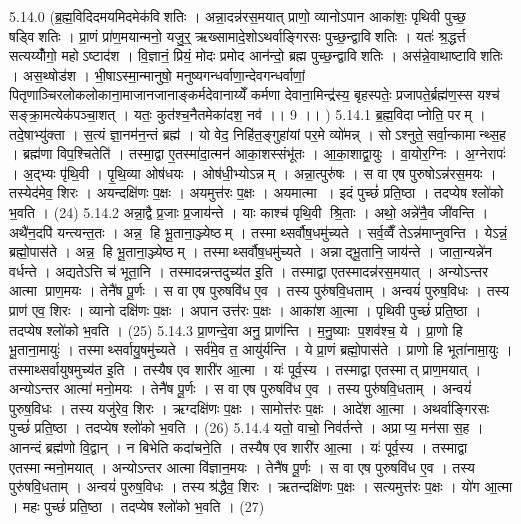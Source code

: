 5.14.0
(ब्र॒ह्म॒विदिदमयमिदमेक॑विशतिः । अन्ना॒दन्न॑रस॒मयात् प्राणो॒ व्यानोऽपान आका॑शः॒ पृथिवी पुच्छ॒ षड्विशतिः । प्रा॒णं प्रा॑ण॒मयान्मनो॒ यजु॒र्॒ ऋख्सामादे॒शोऽथर्वाङ्गिरसः पुच्छ॒न्द्वाविशतिः । यतः॑ श्र॒द्धर्त्त सत्यय्योँ॑गो॒ महोऽष्टाद॑श । वि॒ज्ञानं॒ प्रियं॒ मोदः प्रमोद आन॑न्दो॒ ब्रह्म पुच्छ॒न्द्वाविशतिः । अस॑न्ने॒वाथाष्टाविशतिः । अस॒थ्षोड॑श । भी॒षाऽस्मा॒न्मानुषो॒ मनुष्यगन्धर्वाणा॒न्देवगन्धर्वाणां॒ पितृणाञ्चिरलोकलोकाना॒माजानजानाङ्कर्मदेवानाय्येँ कर्मणा देवाना॒मिन्द्र॑स्य॒ बृहस्पतेः॒ प्रजापते॒र्ब्रह्म॑ण॒स्स यश्च॑ सङ्क्रा॒मत्येक॑पञ्चा॒शत् । यतः॒ कुत॑श्च॒नैतमेका॑दश॒ नव॑ ।। 9 ।। )
5.14.1
ब्र॒ह्म॒विदाप्नोति॒ परम् । तदे॒षाभ्यु॑क्ता । स॒त्यं ज्ञा॒नम॑न॒न्तं ब्रह्म॑ । यो वेद॒ निहि॑त॒ङ्गुहा॑यां पर॒मे व्यो॑मन्न् । सोऽश्नुते॒ सर्वा॒न्कामान्थ्स॒ह । ब्रह्म॑णा विप॒श्चितेति॑ । तस्मा॒द्वा ए॒तस्मा॑दा॒त्मन॑ आका॒शस्संभू॑तः । आ॒का॒शाद्वा॒युः । वा॒योर॒ग्निः । अ॒ग्नेरापः॑ । अ॒द्भ्यः पृ॑थि॒वी । पृ॒थि॒व्या ओष॑धयः । ओष॑धी॒भ्योऽन्नम् । अन्ना॒त्पुरु॑षः । स वा एष पुरुषोऽन्न॑रस॒मयः । तस्येद॑मेव॒ शिरः । अयन्दक्षि॑णः प॒क्षः । अयमुत्त॑रः प॒क्षः । अयमात्मा । इदं पुच्छं॑ प्रति॒ष्ठा । तदप्येष श्लो॑को भ॒वति । (24)
5.14.2
अन्ना॒द्वै प्र॒जाः प्र॒जाय॑न्ते । याः काश्च॑ पृथि॒वी श्रि॒ताः । अथो॒ अन्ने॑नै॒व जी॑वन्ति । अथै॑न॒दपि॑ यन्त्यन्त॒तः । अन्न॒ हि भू॒ताना॒ञ्ज्येष्ठम् । तस्माथ्सर्वौष॒धमु॑च्यते । सर्व॒व्वैँ तेऽन्न॑माप्नुवन्ति । येऽन्नं॒ ब्रह्मो॒पास॑ते । अन्न॒ हि भू॒ताना॒ञ्ज्येष्ठम् । तस्माथ्सर्वौष॒धमु॑च्यते । अन्नाद्भू॒तानि॒ जाय॑न्ते । जाता॒न्यन्ने॑न वर्धन्ते । अद्यतेऽत्ति च॑ भूता॒नि । तस्मादन्नन्तदुच्य॑त इ॒ति । तस्माद्वा एतस्मादन्न॑रस॒मयात् । अन्योऽन्तर आत्मा प्राण॒मयः । तेनै॑ष पू॒र्णः । स वा एष पुरुषवि॑ध ए॒व । तस्य पुरु॑षवि॒धताम् । अन्वयं॑ पुरुष॒विधः । तस्य प्राण॑ एव॒ शिरः । व्यानो दक्षि॑णः प॒क्षः । अपान उत्त॑रः प॒क्षः । आका॑श आ॒त्मा । पृथिवी पुच्छं॑ प्रति॒ष्ठा । तदप्येष श्लो॑को भ॒वति । (25)
5.14.3
प्रा॒णन्दे॒वा अनु॒ प्राण॑न्ति । म॒नु॒ष्याः प॒शव॑श्च॒ ये । प्रा॒णो हि भू॒ताना॒मायुः॑ । तस्माथ्सर्वायु॒षमु॑च्यते । सर्व॑मे॒व त॒ आयु॑र्यन्ति । ये प्रा॒णं ब्रह्मो॒पास॑ते । प्राणो हि भूता॑नामा॒युः । तस्माथ्सर्वायुषमुच्य॑त इ॒ति । तस्यैष एव शारी॑र आ॒त्मा । यः॑ पूर्व॒स्य । तस्माद्वा एतस्मात् प्राण॒मयात् । अन्योऽन्तर आत्मा॑ मनो॒मयः । तेनै॑ष पू॒र्णः । स वा एष पुरुषवि॑ध ए॒व । तस्य पुरु॑षवि॒धताम् । अन्वयं॑ पुरुष॒विधः । तस्य यजु॑रेव॒ शिरः । ऋग्दक्षि॑णः प॒क्षः । सामोत्त॑रः प॒क्षः । आदे॑श आ॒त्मा । अथर्वाङ्गिरसः पुच्छं॑ प्रति॒ष्ठा । तदप्येष श्लो॑को भ॒वति । (26)
5.14.4
यतो॒ वाचो॒ निव॑र्तन्ते । अप्राप्य॒ मन॑सा स॒ह । आनन्दं ब्रह्म॑णो वि॒द्वान् । न बिभेति कदा॑चने॒ति । तस्यैष एव शारी॑र आ॒त्मा । यः॑ पूर्व॒स्य । तस्माद्वा एतस्मान्मनो॒मयात् । अन्योऽन्तर आत्मा वि॑ज्ञान॒मयः । तेनै॑ष पू॒र्णः । स वा एष पुरुषवि॑ध ए॒व । तस्य पुरु॑षवि॒धताम् । अन्वयं॑ पुरुष॒विधः । तस्य श्र॑द्धैव॒ शिरः । ऋतन्दक्षि॑णः प॒क्षः । सत्यमुत्त॑रः प॒क्षः । यो॑ग आ॒त्मा । महः पुच्छं॑ प्रति॒ष्ठा । तदप्येष श्लो॑को भ॒वति । (27)
